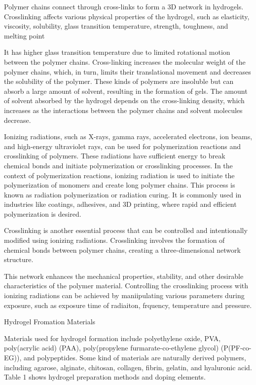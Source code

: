 \documentclass[../../main-notes.tex]{subfiles}
\begin{document}
Polymer chains connect through cross-links to form a 3D network in hydrogels. 
Crosslinking affects various physical properties of the hydrogel, such as elasticity, viscosity, solubility, glass transition temperature, strength, toughness, and melting point


It has higher glass transition temperature due to limited rotational motion between the polymer chains. 
Cross-linking increases the molecular weight of the polymer chains, which, in turn, limits their translational movement and decreases the solubility of the polymer.
These kinds of polymers are insoluble but can absorb a large amount of solvent, resulting in the formation of gels.
The amount of solvent absorbed by the hydrogel depends on the cross-linking density, which increases as the interactions between the polymer chains and solvent molecules decrease.



Ionizing radiations, such as X-rays, gamma rays, accelerated electrons, ion beams, and high-energy ultraviolet rays, can be used for polymerization reactions and crosslinking of polymers. 
These radiations have sufficient energy to break chemical bonds and initiate polymerization or crosslinking processes. 
In the context of polymerization reactions, ionizing radiation is used to initiate the polymerization of monomers and create long polymer chains. 
This process is known as radiation polymerization or radiation curing. It is commonly used in industries like coatings, adhesives, and 3D printing, where rapid and efficient polymerization is desired. 

Crosslinking is another essential process that can be controlled and intentionally modified using ionizing radiations. 
Crosslinking involves the formation of chemical bonds between polymer chains, creating a three-dimensional network structure. 

This network enhances the mechanical properties, stability, and other desirable characteristics of the polymer material. 
Controlling the crosslinking process with ionizing radiations can be achieved by maniipulating various parameters during exposure, such as exposure time of radiaiton, frquency, temperature and pressure.

Hydrogel Fromation Materials

Materials used for hydrogel formation include polyethylene oxide, PVA, poly(acrylic acid) (PAA), poly(propylene furmarate-co-ethylene glycol) (P(PF-co-EG)), and polypeptides. 
Some kind of materials are naturally derived polymers, including agarose, alginate, chitosan, collagen, fibrin, gelatin, and hyaluronic acid. 
Table 1 shows hydrogel preparation methods and doping elements.
\end{document}
